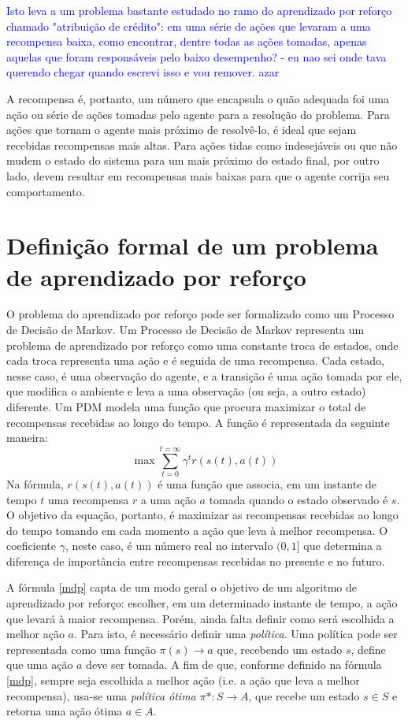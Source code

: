 \documentclass[cic,tc]{iiufrgs}
\newcommand\henrique[1]{\textcolor{blue}{#1}}
\begin{document}
\henrique{Isto leva a um problema bastante estudado no ramo
do aprendizado por reforço chamado "atribuição de crédito": em uma série de ações que levaram a uma recompensa baixa, como encontrar, dentre todas as ações tomadas, apenas aquelas que
foram responsáveis pelo baixo desempenho?  - eu nao sei onde tava querendo chegar quando escrevi isso e vou remover. azar}

A recompensa é, portanto, um número que encapsula o quão adequada foi uma ação ou série de ações tomadas pelo agente para a resolução do problema. Para
ações que tornam o agente mais próximo de resolvê-lo, é ideal que sejam recebidas recompensas mais altas. Para ações tidas como indesejáveis ou que não
mudem o estado do sistema para um mais próximo do estado final, por outro lado, devem resultar em recompensas mais baixas para que o agente corrija seu
comportamento.

\section{Definição formal de um problema de aprendizado por reforço}
O problema do aprendizado por reforço pode ser formalizado como um Processo de Decisão de Markov. Um Processo de Decisão de Markov representa um problema
de aprendizado por reforço como uma constante troca de estados, onde cada troca representa uma ação e é seguida de uma recompensa. Cada estado, nesse caso,
é uma observação do agente, e a transição é uma ação tomada por ele, que modifica o ambiente e leva a uma observação (ou seja, a outro estado) diferente.
Um PDM modela uma função que procura maximizar o total de recompensas recebidas ao longo do tempo. A função é representada da seguinte maneira:
\begin{equation}
  \label{mdp}
 \max{\sum_{t=0}^{t=\infty} \gamma^{t}r(s(t),a(t))}
\end{equation}
 Na fórmula, $r(s(t), a(t))$ é uma função que associa, em um instante de tempo $t$ uma recompensa $r$ a uma ação $a$ tomada quando o estado observado é
 $s$. O objetivo da equação, portanto, é maximizar as recompensas recebidas ao longo do tempo tomando em cada momento a ação que leva à melhor recompensa.
 O coeficiente $\gamma$, neste caso, é um número real no intervalo $(0,1]$ que determina a diferença de importância entre recompensas recebidas no presente
 e no futuro.

A fórmula \ref{mdp} capta de um modo geral o objetivo de um algoritmo de aprendizado por reforço: escolher, em um determinado instante de tempo, a ação que levará
à maior recompensa. Porém, ainda falta definir como será escolhida a melhor ação $a$. Para isto, é necessário definir uma \textit{política}. Uma política
pode ser representada como uma função $\pi(s) \rightarrow a$ que, recebendo um estado $s$, define que uma ação $a$ deve ser tomada. A fim de que, conforme
definido na fórmula \ref{mdp}, sempre seja escolhida a melhor ação (i.e. a ação que leva a melhor recompensa), usa-se uma \textit{política ótima} $\pi*: S \rightarrow A$, que
recebe um estado $s \in S$ e retorna uma ação ótima $a \in A$.
\end{document}
